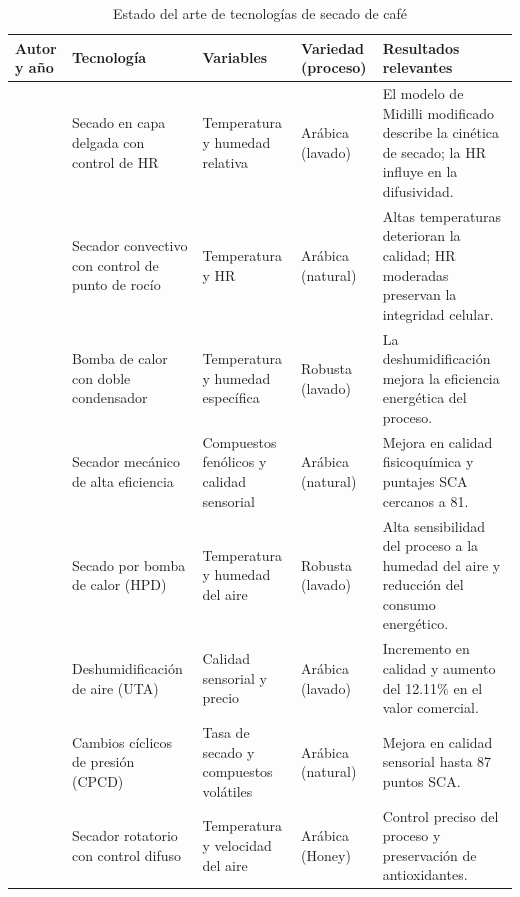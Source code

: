 \begin{table}[htbp]
\centering
\small
\renewcommand{\arraystretch}{1.2}
\caption{Estado del arte de tecnologías de secado de café}
\begin{tabular}{p{3cm} p{3cm} p{3cm} p{2cm} p{4cm}}
\hline
\textbf{Autor y año} & \textbf{Tecnología} & \textbf{Variables} & \textbf{Variedad (proceso)} & \textbf{Resultados relevantes} \\
\hline

\cite{phitakwinai_thinlayer_2019} & Secado en capa delgada con control de HR & Temperatura y humedad relativa & Arábica (lavado) & El modelo de Midilli modificado describe la cinética de secado; la HR influye en la difusividad. \\

\cite{borem_quality_2018} & Secador convectivo con control de punto de rocío & Temperatura y HR & Arábica (natural) & Altas temperaturas deterioran la calidad; HR moderadas preservan la integridad celular. \\

\cite{dzaky_activation_2022} & Bomba de calor con doble condensador & Temperatura y humedad específica & Robusta (lavado) & La deshumidificación mejora la eficiencia energética del proceso. \\

\cite{abreu_influence_2025} & Secador mecánico de alta eficiencia & Compuestos fenólicos y calidad sensorial & Arábica (natural) & Mejora en calidad fisicoquímica y puntajes SCA cercanos a 81. \\

\cite{fauzi_influence_2024} & Secado por bomba de calor (HPD) & Temperatura y humedad del aire & Robusta (lavado) & Alta sensibilidad del proceso a la humedad del aire y reducción del consumo energético. \\

\cite{konopatzki_price_2019} & Deshumidificación de aire (UTA) & Calidad sensorial y precio & Arábica (lavado) & Incremento en calidad y aumento del 12.11\% en el valor comercial. \\

\cite{parra-coronado_preliminary_2020} & Cambios cíclicos de presión (CPCD) & Tasa de secado y compuestos volátiles & Arábica (natural) & Mejora en calidad sensorial hasta 87 puntos SCA. \\

\cite{syamsiana_enhancing_2025} & Secador rotatorio con control difuso & Temperatura y velocidad del aire & Arábica (Honey) & Control preciso del proceso y preservación de antioxidantes. \\

\hline
\end{tabular}
\end{table}

